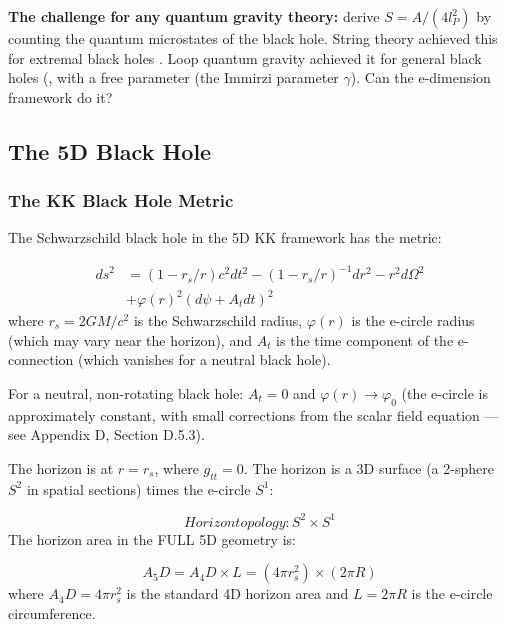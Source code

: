 \documentclass[aps,prd,preprint,superscriptaddress,longbibliography,floatfix]{revtex4-2}
\theoremstyle{remark}
\begin{document}
\textbf{The challenge for any quantum gravity theory:} derive $S = A/(4l_P^{2})$ by counting the quantum microstates of the black hole. String theory achieved this for extremal black holes \cite{StromingerVafa1996}. Loop quantum gravity achieved it for general black holes (\cite{Rovelli1996}, \cite{Ashtekar1998} with a free parameter (the Immirzi parameter $\gamma$). Can the e-dimension framework do it?



\subsection{The 5D Black Hole}


\subsubsection{The KK Black Hole Metric}

The Schwarzschild black hole in the 5D KK framework has the metric:


\begin{align}
    d\hat{s}^{2} &= (1 - r_s/r) c^{2}dt^{2} - (1 - r_s/r)^{-1} dr^{2} - r^{2} d\Omega^{2} \\
    & + \varphi(r)^{2} (d\psi + A_t dt)^{2}
\end{align}
where $r_s = 2GM/c^{2}$ is the Schwarzschild radius, $\varphi(r)$ is the e-circle radius (which may vary near the horizon), and $A_t$ is the time component of the e-connection (which vanishes for a neutral black hole).

For a neutral, non-rotating black hole: $A_t = 0$ and $\varphi(r) \to \varphi_{0}$ (the e-circle is approximately constant, with small corrections from the scalar field equation --- see Appendix D, Section D.5.3).

The horizon is at $r = r_s$, where $g_{tt} = 0$. The horizon is a 3D surface (a 2-sphere $S^{2}$ in spatial sections) times the e-circle $S^{1}$:


\begin{equation}
    Horizon topology: S^{2} \times S^{1}
\end{equation}
The horizon area in the FULL 5D geometry is:


\begin{equation}
    A_{5}D = A_{4}D \times L = (4\pi r_s^{2}) \times (2\pi R)
\end{equation}
where $A_{4}D = 4\pi r_s^{2}$ is the standard 4D horizon area and $L = 2\pi R$ is the e-circle circumference.
\end{document}
